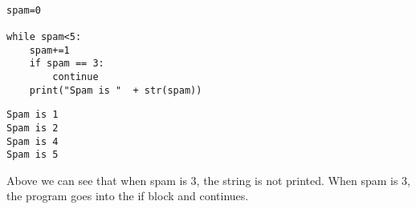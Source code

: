 \documentclass[11pt]{article}
\begin{document}
\begin{verbatim}

spam=0

while spam<5:
    spam+=1
    if spam == 3:
        continue
    print("Spam is "  + str(spam))

\end{verbatim}

\begin{verbatim}
Spam is 1
Spam is 2
Spam is 4
Spam is 5
\end{verbatim}



Above we can see that when spam is 3, the string is not printed. When spam is 3, the program goes into the if block and continues.
\end{document}
